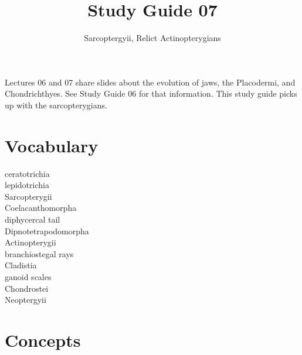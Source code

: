 \documentclass[letterpaper]{tufte-handout}
\title{Study Guide 07}
\author{Sarcoptergyii, Relict Actinopterygians}
\date{} %
\begin{document}
\maketitle	%


Lectures 06 and 07 share slides about the evolution of jaws, the Placodermi,
and Chondrichthyes. See Study Guide 06 for that information. This study guide
picks up with the sarcopterygians.

\section{Vocabulary}
\vspace{-1\baselineskip}
\begin{multicols}{2}
ceratotrichia \\
lepidotrichia \\
Sarcopterygii \\
Coelacanthomorpha \\
diphycercal tail \\
Dipnotetrapodomorpha \\
Actinopterygii \\
branchiostegal rays \\
Cladistia \\
ganoid scales \\
Chondrostei \\
Neoptergyii
\end{multicols}

\section{Concepts}
\end{document}
